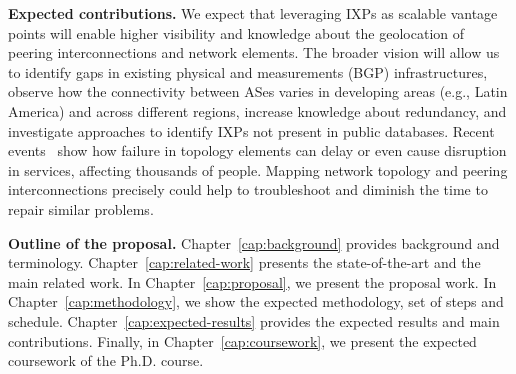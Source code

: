 	\textbf{Expected contributions.} We expect that leveraging IXPs as scalable vantage points will enable higher visibility and knowledge about the geolocation of peering interconnections and network elements. The broader vision will allow us to identify gaps in existing physical and measurements (BGP) infrastructures, observe how the connectivity between ASes varies in developing areas (e.g., Latin America) and across different regions, increase knowledge about redundancy, and investigate approaches to identify IXPs not present in public databases. 
	Recent events~\cite{routerDMV, routerUnited} show how failure in topology elements can delay or even cause disruption in services, affecting thousands of people. Mapping network topology and peering interconnections precisely could help to troubleshoot and diminish the time to repair similar problems.

	\textbf{Outline of the proposal.} Chapter~\ref{cap:background} provides background and terminology. Chapter~\ref{cap:related-work} presents the state-of-the-art and the main related work. In Chapter~\ref{cap:proposal}, we present the proposal work. In Chapter~\ref{cap:methodology}, we show the expected methodology, set of steps and schedule. Chapter~\ref{cap:expected-results} provides the expected results and main contributions. Finally, in Chapter~\ref{cap:coursework}, we present the expected coursework of the Ph.D. course.


